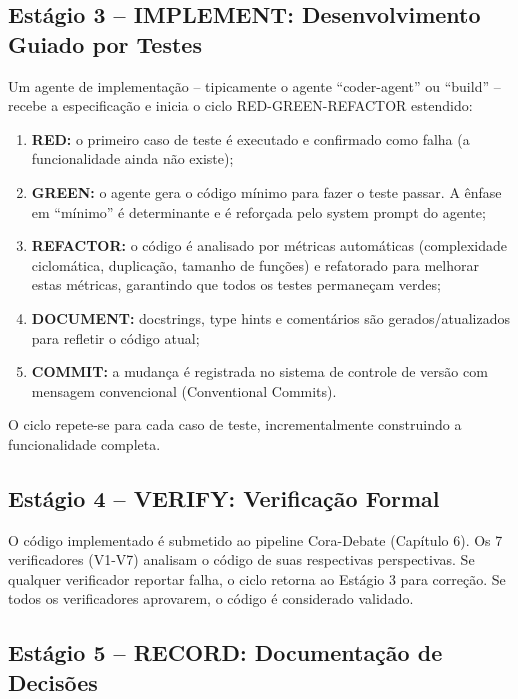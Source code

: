 \documentclass[12pt,a4paper,sumario=tradicional,openany]{abntex2}
\begin{document}
\subsection{Estágio 3 -- IMPLEMENT: Desenvolvimento Guiado por Testes}

Um agente de implementação -- tipicamente o agente ``coder-agent'' ou ``build'' -- recebe a especificação e inicia o ciclo RED-GREEN-REFACTOR estendido:

\begin{enumerate}[leftmargin=*]
    \item \textbf{RED:} o primeiro caso de teste é executado e confirmado como falha (a funcionalidade ainda não existe);
    \item \textbf{GREEN:} o agente gera o código mínimo para fazer o teste passar. A ênfase em ``mínimo'' é determinante e é reforçada pelo system prompt do agente;
    \item \textbf{REFACTOR:} o código é analisado por métricas automáticas (complexidade ciclomática, duplicação, tamanho de funções) e refatorado para melhorar estas métricas, garantindo que todos os testes permaneçam verdes;
    \item \textbf{DOCUMENT:} docstrings, type hints e comentários são gerados/atualizados para refletir o código atual;
    \item \textbf{COMMIT:} a mudança é registrada no sistema de controle de versão com mensagem convencional (Conventional Commits).
\end{enumerate}

O ciclo repete-se para cada caso de teste, incrementalmente construindo a funcionalidade completa.

\subsection{Estágio 4 -- VERIFY: Verificação Formal}

O código implementado é submetido ao pipeline Cora-Debate (Capítulo 6). Os 7 verificadores (V1-V7) analisam o código de suas respectivas perspectivas. Se qualquer verificador reportar falha, o ciclo retorna ao Estágio 3 para correção. Se todos os verificadores aprovarem, o código é considerado validado.

\subsection{Estágio 5 -- RECORD: Documentação de Decisões}
\end{document}
